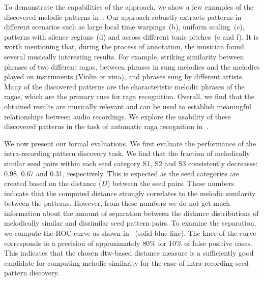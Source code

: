 To demonstrate the capabilities of the approach, we show a few examples of the discovered melodic patterns in~. Our approach robustly extracts patterns in different scenarios such as large local time warpings~(b), uniform scaling~(c), patterns with silence regions~(d) and across different tonic pitches~(e and f). It is worth mentioning that, during the process of annotation, the musician found several musically interesting results. For example, striking similarity between phrases of two different \glspl{raga}, between phrases in sung melodies and the melodies played on instruments (Violin or \Gls{vina}), and phrases sung by different artists. Many of the discovered patterns are the characteristic melodic phrases of the \glspl{raga}, which are the primary cues for \gls{raga} recognition. Overall, we find that the obtained results are musically relevant and can be used to establish meaningful relationships between audio recordings. We explore the usability of these discovered patterns in the task of automatic \gls{raga} recognition in~.

We now present our formal evaluations. We first evaluate the performance of the intra-recording pattern discovery task. We find that the fraction of melodically similar seed pairs within each seed category S1, S2 and S3 consistently decreases: 0.98, 0.67 and 0.31, respectively. This is expected as the seed categories are created based on the distance ($D$) between the seed pairs. These numbers indicate that the computed distance strongly correlates to the melodic similarity between the patterns. However, from these numbers we do not get much information about the amount of separation between the distance distributions of melodically similar and dissimilar seed pattern pairs. To examine the separation, we compute the ROC curve as shown in~ (solid blue line). The knee of the curve corresponds to a precision of approximately 80\% for 10\% of false positive cases. This indicates that the chosen \gls{dtw}-based distance measure is a sufficiently good candidate for computing melodic similarity for the case of intra-recording seed pattern discovery. 



